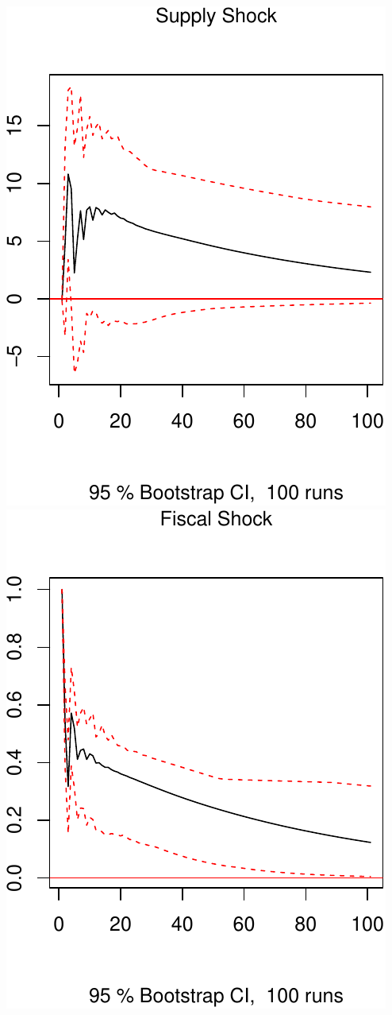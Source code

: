 \documentclass[11pt,preprint, authoryear]{elsarticle}
\numberwithin{equation}{section}
\numberwithin{figure}{section}
\numberwithin{table}{section}
\begin{document}
\includegraphics{TS_proj_files/figure-latex/unnamed-chunk-32-1.pdf}
\includegraphics{TS_proj_files/figure-latex/unnamed-chunk-32-2.pdf}
\end{document}

